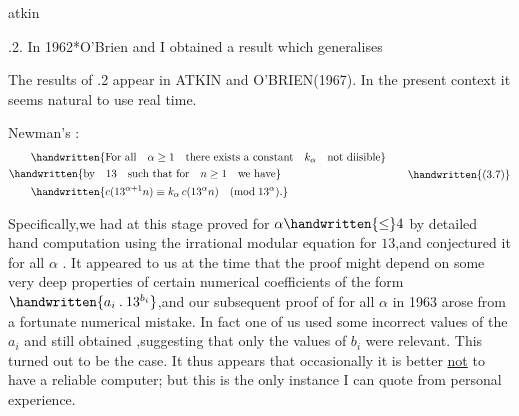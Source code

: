 \noindent\hfill atkin  

\noindent{}.2. In 1962*O'Brien and I obtained a result which generalises

\noindent\handwritten{\rule{\linewidth}{0.4pt}}

\noindent *The results of \handwritten{\S}.2 appear in ATKIN and O'BRIEN(1967). In the present context it seems natural to use real time.

\noindent\handwritten{\rule{\linewidth}{0.4pt}}

\noindent Newman's :
\[
\begin{aligned}
&\qquad\handwritten{\text{For all}\quad\alpha\geq1\quad\text{there exists a constant}\quad k_{\alpha}\quad\text{not diisible}}\\
&\handwritten{\text{by}\quad13\quad\text{such that for}\quad n\geq1\quad\text{we have}}\\
&\qquad\handwritten{c(13^{\alpha+1}n)\equiv k_{\alpha}\,c(13^{\alpha}n)\quad(\mathrm{mod}\;13^{\alpha}).}
\end{aligned}
\tag*{\handwritten{(3.7)}}
\]

\noindent Specifically,we had at this stage proved  for $\alpha\handwritten{\leq}4$ by detailed hand computation using the irrational modular equation for $13$,and conjectured it for all $\alpha$ . It appeared to us at the time that the proof might depend on some very deep properties of certain numerical coefficients of the form $\handwritten{a_{i}\mathbin{.}13^{b_{i}}}$,and our subsequent proof of  for all $\alpha$ in 1963 arose from a fortunate numerical mistake. In fact one of us used \unsure{\textquotesingle}some incorrect values of the \uline{$a_{i}$} and still obtained ,suggesting that only the values of \uline{$b_{i}$} were relevant. This turned out to be the case. It thus appears that occasionally it is better \uline{not} to have a reliable computer; but this is the only instance I can quote from personal experience.

